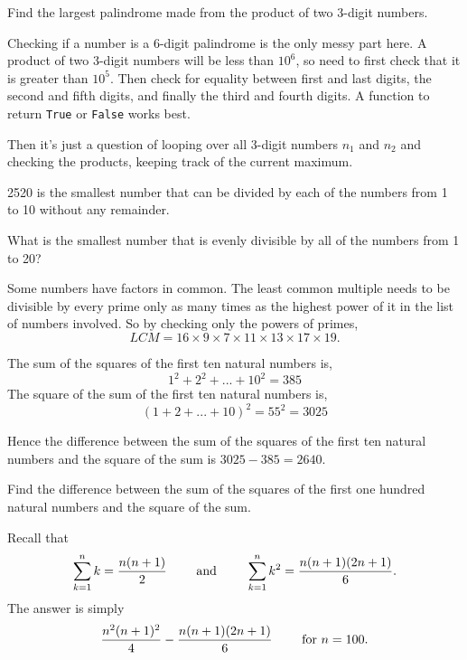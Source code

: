 Find the largest palindrome made from the product of two 3-digit numbers.


Checking if a number is a 6-digit palindrome is the only messy part here.  A product of two 3-digit numbers will
be less than $10^6$, so need to first check that it is greater than $10^5$.  Then check for equality between first and last digits,
the second and fifth digits, and finally the third and fourth digits.  A function to return \verb"True" or \verb"False" works best.

Then it's just a question of looping over all 3-digit numbers $n_1$ and $n_2$ and checking the products, keeping track of the current maximum.






2520 is the smallest number that can be divided by each of the numbers from 1 to 10 without any remainder.

What is the smallest number that is evenly divisible by all of the numbers from 1 to 20?


Some numbers have factors in common.  The least common multiple needs to be divisible by every prime only
as many times as the highest power of it in the list of numbers involved.  So by checking only the powers of primes,
$$ LCM = 16\times9\times7\times11\times13\times17\times19.$$





The sum of the squares of the first ten natural numbers is,
$$1^2 + 2^2 + ... + 10^2 = 385$$
The square of the sum of the first ten natural numbers is,
$$(1 + 2 + ... + 10)^2 = 55^2 = 3025$$

Hence the difference between the sum of the squares of the first ten natural numbers and the square of the sum is $3025 - 385 = 2640$.

Find the difference between the sum of the squares of the first one hundred natural numbers and the square of the sum.

 Recall that
$$\sum_{k=1}^n k = \frac{n(n+1)}2\qquad \hbox{ and } \qquad \sum_{k=1}^n k^2 = \frac{n(n+1)(2n+1)}{6}.$$
The answer is simply
$$\frac{n^2(n+1)^2}4 - \frac{n(n+1)(2n+1)}{6} \qquad \hbox{ for }n= 100.$$

